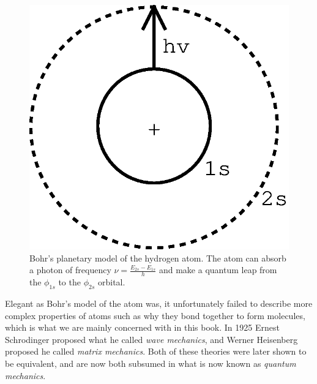 \begin{figure}
\begin{center}
\includegraphics[scale=0.5]{bohr_atom2.eps}
\caption{Bohr's planetary model of the hydrogen atom. The atom can
absorb a photon of frequency $\nu=\frac{E_{2s}-E_{1s}}{h}$ and make a
quantum leap from the $\phi_{1s}$ to the $\phi_{2s}$ orbital.} 
\end{center}
\label{bohr-atom}
\end{figure}

Elegant as Bohr's model of the atom was, it unfortunately failed to
describe more complex properties of atoms such as why they bond
together to form molecules, which is what we are mainly concerned with
in this book. In 1925 Ernest Schrodinger proposed what he called
\emph{wave mechanics}, and Werner Heisenberg proposed he called 
\emph{matrix mechanics}. Both of these theories were later shown to be
equivalent, and are now both subsumed in what is now known as
\emph{quantum mechanics}.

